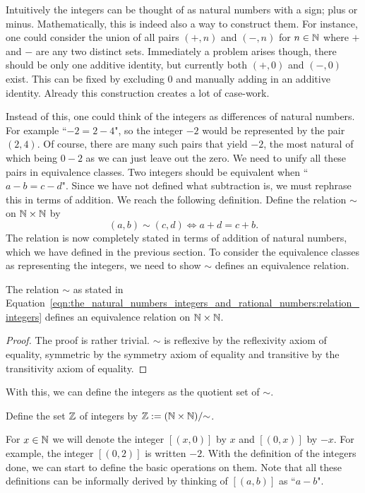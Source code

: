 \documentclass[../main.tex]{subfiles}
\begin{document}
Intuitively the integers can be thought of as natural numbers with a sign; plus or minus. Mathematically, this is indeed also a way to construct them. For instance, one could consider the union of all pairs $(+,n)$ and $(-,n)$ for $n\in\mathbb{N}$ where $+$ and $-$ are any two distinct sets. Immediately a problem arises though, there should be only one additive identity, but currently both $(+,0)$ and $(-,0)$ exist. This can be fixed by excluding $0$ and manually adding in an additive identity. Already this construction creates a lot of case-work.

Instead of this, one could think of the integers as differences of natural numbers. For example ``$-2=2-4$", so the integer $-2$ would be represented by the pair $(2,4)$. Of course, there are many such pairs that yield $-2$, the most natural of which being $0-2$ as we can just leave out the zero. We need to unify all these pairs in equivalence classes. Two integers should be equivalent when ``$a-b=c-d$". Since we have not defined what subtraction is, we must rephrase this in terms of addition. We reach the following definition. Define the relation $\sim$ on $\mathbb{N}\times\mathbb{N}$ by
\begin{equation}\label{eqn:the_natural_numbers_integers_and_rational_numbers:relation_integers}
    (a,b)\sim(c,d)\iff a+d=c+b.
\end{equation}
The relation is now completely stated in terms of addition of natural numbers, which we have defined in the previous section. To consider the equivalence classes as representing the integers, we need to show $\sim$ defines an equivalence relation.
\begin{lemma}
    The relation $\sim$ as stated in Equation~\eqref{eqn:the_natural_numbers_integers_and_rational_numbers:relation_integers} defines an equivalence relation on $\mathbb{N}\times\mathbb{N}$.
\end{lemma}
\begin{proof}
    The proof is rather trivial. $\sim$ is reflexive by the reflexivity axiom of equality, symmetric by the symmetry axiom of equality and transitive by the transitivity axiom of equality.
\end{proof}
With this, we can define the integers as the quotient set of $\sim$.
\begin{definition}[Integers]
    Define the set $\mathbb{Z}$ of integers by $\mathbb{Z}:=(\mathbb{N}\times\mathbb{N})/{\sim}$.
\end{definition}
For $x\in\mathbb{N}$ we will denote the integer $[(x,0)]$ by $x$ and $[(0,x)]$ by $-x$. For example, the integer $[(0,2)]$ is written $-2$. With the definition of the integers done, we can start to define the basic operations on them. Note that all these definitions can be informally derived by thinking of $[(a,b)]$ as ``$a-b$".
\end{document}
